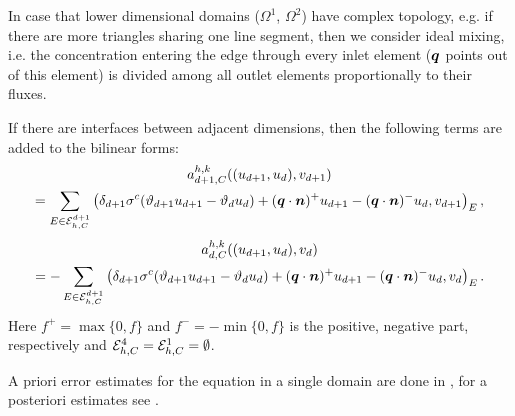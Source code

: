In case that lower dimensional domains ($\Omega^1$, $\Omega^2$) have complex topology, e.g. if there are more triangles sharing one line segment, then we consider ideal mixing, i.e. the concentration entering the edge through every inlet element ($\mathbf{\boldsymbol{q}}$ points out of this element) is divided among all outlet elements proportionally to their fluxes.

If there are interfaces between adjacent dimensions, then the following terms are added to the bilinear forms:
\begin{multline*}
a^{h,k}_{d+1,C}((u_{d+1},u_d),v_{d+1})\\
= \sum_{E\in\mathcal E_{h,C}^{d+1}} \left(\delta_{d+1}\sigma^c(\vartheta_{d+1}u_{d+1}-\vartheta_d u_d)+(\mathbf{\boldsymbol{q}}\cdot\mathbf{\boldsymbol{n}})^+u_{d+1} - (\mathbf{\boldsymbol{q}}\cdot\mathbf{\boldsymbol{n}})^-u_d,v_{d+1}\right)_E,
\end{multline*}
\begin{multline*}
a^{h,k}_{d,C}((u_{d+1},u_d),v_d)\\
= -\sum_{E\in\mathcal E_{h,C}^{d+1}} \left(\delta_{d+1}\sigma^c(\vartheta_{d+1}u_{d+1}-\vartheta_d u_d)+(\mathbf{\boldsymbol{q}}\cdot\mathbf{\boldsymbol{n}})^+u_{d+1} - (\mathbf{\boldsymbol{q}}\cdot\mathbf{\boldsymbol{n}})^-u_d,v_d\right)_E.
\end{multline*}
Here $f^+=\max\{0,f\}$ and $f^-=-\min\{0,f\}$ is the positive, negative part, respectively and $\mathcal E_{h,C}^4=\mathcal E_{h,C}^1=\emptyset$.

A priori error estimates for the equation in a single domain are done in \cite{ern_stephansen_zunino}, for a posteriori estimates see \cite{ern2010guaranteed}.

